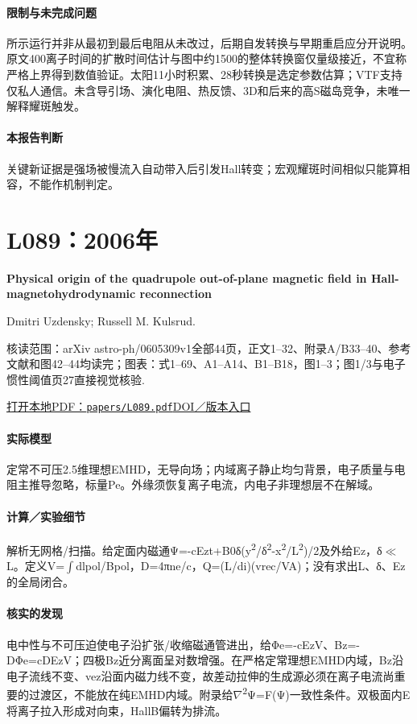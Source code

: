 \paragraph{限制与未完成问题}所示运行并非从最初到最后电阻从未改过，后期自发转换与早期重启应分开说明。原文400离子时间的扩散时间估计与图中约1500的整体转换窗仅量级接近，不宜称严格上界得到数值验证。太阳11小时积累、28秒转换是选定参数估算；VTF支持仅私人通信。未含导引场、演化电阻、热反馈、3D和后来的高S磁岛竞争，未唯一解释耀斑触发。

\paragraph{本报告判断}关键新证据是强场被慢流入自动带入后引发Hall转变；宏观耀斑时间相似只能算相容，不能作机制判定。

\section{L089：2006年}\label{paper:L089}

\textbf{Physical origin of the quadrupole out-of-plane magnetic field in Hall-magnetohydrodynamic reconnection}\citep{L089}\

Dmitri Uzdensky;  Russell M. Kulsrud.

\textsf{核读范围：}arXiv astro-ph/0605309v1全部44页，正文1–32、附录A/B33–40、参考文献和图42–44均读完；\textsf{图表：}式1–69、A1–A14、B1–B18，图1–3；图1/3与电子惯性阈值页27直接视觉核验.

\href{run:papers/L089.pdf}{打开本地PDF：\texttt{papers/L089.pdf}}\quad\href{https://doi.org/10.1063/1.2209627}{DOI／版本入口}

\paragraph{实际模型}定常不可压2.5维理想EMHD，无导向场；内域离子静止均匀背景，电子质量与电阻主推导忽略，标量Pe。外缘须恢复离子电流，内电子非理想层不在解域。

\paragraph{计算／实验细节}解析无网格/扫描。给定面内磁通Ψ=-cEzt+B0δ(y\textsuperscript{2}/δ\textsuperscript{2}-x\textsuperscript{2}/L\textsuperscript{2})/2及外给Ez，δ\ensuremath{\ll}L。定义V=\ensuremath{\int}dlpol/Bpol，D=4πne/c，Q=(L/di)(vrec/VA)；没有求出L、δ、Ez的全局闭合。

\paragraph{核实的发现}电中性与不可压迫使电子沿扩张/收缩磁通管进出，给Φe=-cEzV、Bz=-DΦe=cDEzV；四极Bz近分离面呈对数增强。在严格定常理想EMHD内域，Bz沿电子流线不变、vez沿面内磁力线不变，故差动拉伸的生成源必须在离子电流尚重要的过渡区，不能放在纯EMHD内域。附录给\ensuremath{\nabla}\textsuperscript{2}Ψ=F(Ψ)一致性条件。双极面内E将离子拉入形成对向束，HallB偏转为排流。

